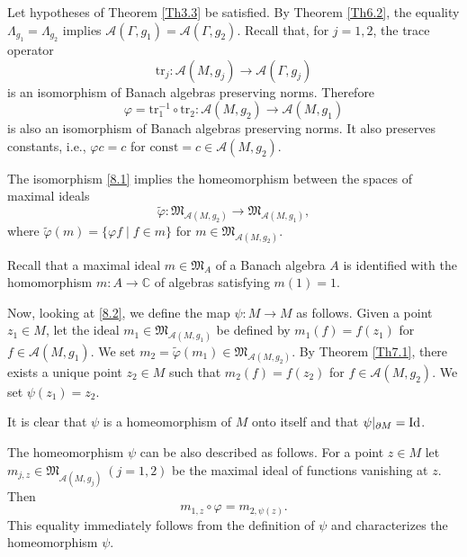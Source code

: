 \documentclass[12pt,reqno]{amsart}
\begin{document}
Let hypotheses of Theorem \ref{Th3.3} be satisfied.
By Theorem \ref{Th6.2}, the equality $\Lambda_{g_1}=\Lambda_{g_2}$ implies
$
{\mathcal A}(\Gamma,g_1)={\mathcal A}(\Gamma,g_2).
$
Recall that, for $j=1,2$, the trace operator
$$
{\mbox{tr}}_j:{\mathcal A}(M,g_j)\to{\mathcal A}(\Gamma,g_j)
$$
is an isomorphism of Banach algebras preserving norms. Therefore
\begin{equation}
\varphi=\mbox{tr}_1^{-1}\circ\mbox{tr}_2:{\mathcal A}(M,g_2)\to {\mathcal A}(M,g_1)
                                \label{8.1}
\end{equation}
is also an isomorphism of Banach algebras preserving norms. It also preserves constants, i.e., $\varphi c=c$ for
$\mbox{const}=c\in{\mathcal A}(M,g_2)$.

The isomorphism \eqref{8.1} implies the homeomorphism between the spaces of maximal ideals
\begin{equation}
\widetilde\varphi:{\mathfrak M}_{{\mathcal A}(M,g_2)}\to{\mathfrak M}_{{\mathcal A}(M,g_1)},
                                \label{8.2}
\end{equation}
where $\widetilde\varphi(m)=\{\varphi f\mid f\in m\}$ for $m\in{\mathfrak M}_{{\mathcal A}(M,g_2)}$.

Recall that a maximal ideal $m\in{\mathfrak M}_A$ of a Banach algebra $A$ is identified with the homomorphism $m:A\to{\mathbb C}$ of algebras satisfying $m(1)=1$.

Now, looking at \eqref{8.2}, we define the map $\psi:M\to M$ as follows. Given a point $z_1\in M$, let the ideal
$m_1\in{\mathfrak M}_{{\mathcal A}(M,g_1)}$ be defined by $m_1(f)=f(z_1)$ for $f\in{\mathcal A}(M,g_1)$. We set
$m_2=\widetilde\varphi(m_1)\in{\mathfrak M}_{{\mathcal A}(M,g_2)}$. By Theorem \ref{Th7.1}, there exists a unique point $z_2\in M$ such that $m_2(f)=f(z_2)$ for $f\in{\mathcal A}(M,g_2)$. We set $\psi(z_1)=z_2$.

It is clear that $\psi$ is a homeomorphism of $M$ onto itself and that $\psi|_{\partial M}=\mbox{\rm Id}$.

The homeomorphism $\psi$ can be also described as follows. For a point $z\in M$ let $m_{j,z}\in{\mathfrak M}_{{\mathcal A}(M,g_j)}\ (j=1,2)$ be the maximal ideal of functions vanishing at $z$. Then
\begin{equation}
m_{1,z}\circ\varphi=m_{2,\psi(z)}.
                                \label{8.3}
\end{equation}
This equality immediately follows from the definition of $\psi$ and characterizes the homeomorphism $\psi$.
\end{document}
